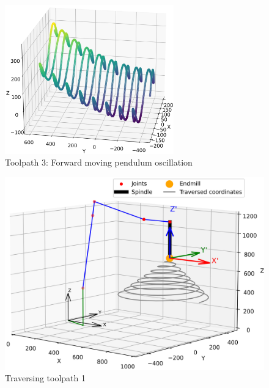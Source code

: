 \begin{figure}[H]%
	\centering
	\includegraphics[width=0.65\textwidth]{figures/path3.png}
	\caption{Toolpath 3: Forward moving pendulum oscillation}
	\label{path3}
\end{figure}







\begin{figure}[H]
	\centerline{\includegraphics[width=1\textwidth]{figures/robotANDpath1.png}}
	\caption{Traversing toolpath 1}
	\label{TP1robot}
\end{figure}





